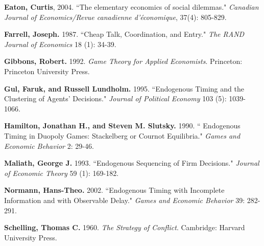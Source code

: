 \documentclass[12pt,english]{article}
\begin{document}
\noindent
\hangindent 12pt
\textbf{Eaton, Curtis}, 2004. ``The elementary economics of social dilemmas." \textit{Canadian Journal of Economics/Revue canadienne d'\'{e}conomique}, 37(4): 805-829.

\noindent
\hangindent 12pt
\textbf{Farrell, Joseph.} 1987. ``Cheap Talk, Coordination, and Entry." \textit{The RAND Journal of Economics} 18 (1): 34-39.

\noindent
\hangindent 12pt
\textbf{Gibbons, Robert.} 1992. \textit{Game Theory for Applied Economists}. Princeton: Princeton University Press.

\noindent
\hangindent 12pt
\textbf{Gul, Faruk, and Russell Lundholm.} 1995. ``Endogenous Timing and the Clustering of Agents' Decisions." \textit{Journal of Political Economy} 103 (5): 1039-1066.

\noindent
\hangindent 12pt
\textbf{Hamilton, Jonathan H., and Steven M. Slutsky.} 1990. `` Endogenous Timing in Duopoly Games: Stackelberg or Cournot Equilibria." \textit{Games and Economic Behavior} 2: 29-46.



\noindent
\hangindent 12pt
\textbf{Maliath, George J.} 1993. ``Endogenous Sequencing of Firm Decisions." \textit{Journal of Economic Theory} 59 (1): 169-182. 

\noindent
\hangindent 12pt
\textbf{Normann, Hans-Theo.} 2002. ``Endogenous Timing with Incomplete Information and with Observable Delay." \textit{Games and Economic Behavior} 39: 282-291.


\noindent
\hangindent 12pt
\textbf{Schelling, Thomas C.} 1960. \textit{The Strategy of Conflict}. Cambridge: Harvard University Press.

\newpage
\end{document}
